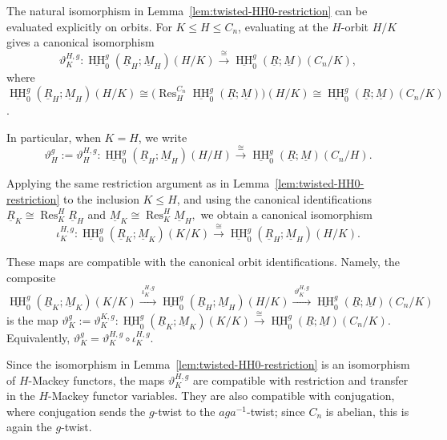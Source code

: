 \documentclass[11pt,oneside]{amsart}
\DeclareMathOperator{\HH}{HH}
\numberwithin{equation}{section}
\numberwithin{figure}{section}
\theoremstyle{plain}
\theoremstyle{definition}
\theoremstyle{remark}
\begin{document}
\begin{remark}\label{rem:twisted-orbit-eval}
The natural isomorphism in Lemma~\ref{lem:twisted-HH0-restriction} can
be evaluated explicitly on orbits. For \(K\le H\le C_n\), evaluating at the
\(H\)-orbit \(H/K\) gives a canonical isomorphism
\[
\vartheta_K^{H,g}\colon
\underline{\HH}_0^g(\underline R_H;\underline M_H)(H/K)
\xrightarrow{\cong}
\underline{\HH}_0^g(\underline R;\underline M)(C_n/K),
\] where
\(
\underline{\HH}_0^g(\underline R_H;\underline M_H)(H/K)
\cong
\bigl(
\operatorname{Res}^{C_n}_H
\underline{\HH}_0^g(\underline R;\underline M)
\bigr)(H/K)
\cong
\underline{\HH}_0^g(\underline R;\underline M)(C_n/K)
\).

In particular, when \(K=H\), we write
\[
\vartheta_H^g:=\vartheta_H^{H,g}\colon
\underline{\HH}_0^g(\underline R_H;\underline M_H)(H/H)
\xrightarrow{\cong}
\underline{\HH}_0^g(\underline R;\underline M)(C_n/H).
\]

Applying the same restriction argument as in
Lemma~\ref{lem:twisted-HH0-restriction} to the inclusion \(K\le H\), and using
the canonical identifications
\(
\underline R_K\cong \operatorname{Res}_K^H\underline R_H\) and
\(\underline M_K\cong \operatorname{Res}_K^H\underline M_H,
\)
we obtain a canonical isomorphism
\[
\iota_K^{H,g}\colon
\underline{\HH}_0^g(\underline R_K;\underline M_K)(K/K)
\xrightarrow{\cong}
\underline{\HH}_0^g(\underline R_H;\underline M_H)(H/K).
\]

These maps are compatible with the canonical orbit identifications. Namely,
the composite
\[
\underline{\HH}_0^g(\underline R_K;\underline M_K)(K/K)
\xrightarrow{\ \iota_K^{H,g}\ }
\underline{\HH}_0^g(\underline R_H;\underline M_H)(H/K)
\xrightarrow{\ \vartheta_K^{H,g}\ }
\underline{\HH}_0^g(\underline R;\underline M)(C_n/K)
\]
is the  map
\(
\vartheta_K^g:=\vartheta_K^{K,g}\colon
\underline{\HH}_0^g(\underline R_K;\underline M_K)(K/K)
\xrightarrow{\cong}
\underline{\HH}_0^g(\underline R;\underline M)(C_n/K).
\)
Equivalently,
\(
\vartheta_K^g=\vartheta_K^{H,g}\circ \iota_K^{H,g}.
\)
\end{remark}

Since the isomorphism in Lemma~\ref{lem:twisted-HH0-restriction} is an
isomorphism of \(H\)-Mackey functors, the maps
\(\vartheta_K^{H,g}\) are compatible with restriction and transfer in the
\(H\)-Mackey functor variables.  They are also compatible with conjugation,
where conjugation sends the \(g\)-twist to the \(aga^{-1}\)-twist; since
\(C_n\) is abelian, this is again the \(g\)-twist.
\end{document}

